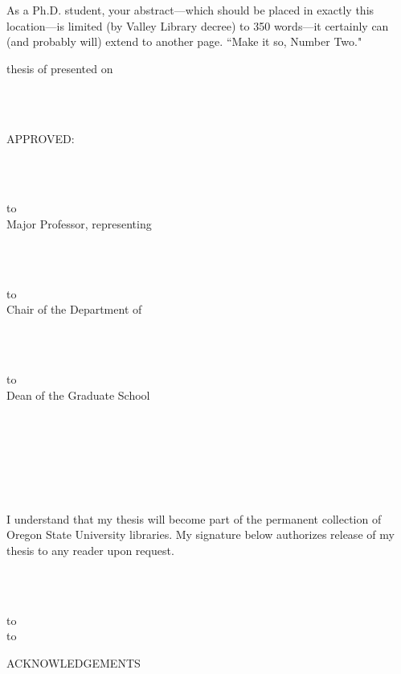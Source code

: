 \documentclass[11pt]{gthesis2}  %
\begin{document}
%
%
\indent As a Ph.D. student, your abstract---which should be placed
in exactly this location---is limited (by Valley Library decree)
to 350 words---it certainly can (and probably will) extend to
another page. ``Make it so, Number Two."
%
\clearpage
%
\DisplayCopyright %
%
%
\DisplayTitlePage %
%
%
%
\thispagestyle{empty} {\baselineskip=14.5pt
\def\ruleline{\hbox to \hsize{\hrulefill}\\[-2ex]}
\noindent \underline{\mydegree} thesis of \underline{\myname}
presented on \underline{\myday}
\strut\\
\strut\\
APPROVED:\\
\strut\\
\strut\\
\ruleline
Major Professor, representing \mymajor\\
\strut\\
\strut\\
\ruleline
Chair of the Department of \mydept\\
\strut\\
\strut\\
\ruleline
Dean of the Graduate School\\
\strut\\
\strut\\
\strut\\
\strut\\
I understand that my thesis will become part of the permanent
collection of Oregon State University libraries.  My signature
below authorizes release of my thesis to any reader upon request.
\strut\\
\strut\\
\ruleline \hbox to \textwidth{\hfil \myname, Author \hfil} }
%
%
%
\clearpage
%
%
\begin{center}
ACKNOWLEDGEMENTS
\end{center}
\noindent
\bigskip
%
\end{document}
